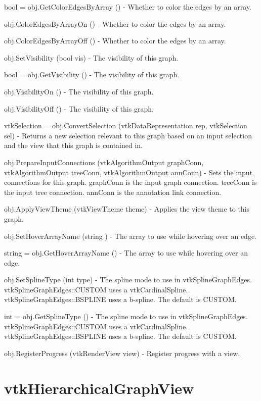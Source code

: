 \begin{DoxyItemize}
\item {\ttfamily bool = obj.\-Get\-Color\-Edges\-By\-Array ()} -\/ Whether to color the edges by an array.  
\item {\ttfamily obj.\-Color\-Edges\-By\-Array\-On ()} -\/ Whether to color the edges by an array.  
\item {\ttfamily obj.\-Color\-Edges\-By\-Array\-Off ()} -\/ Whether to color the edges by an array.  
\item {\ttfamily obj.\-Set\-Visibility (bool vis)} -\/ The visibility of this graph.  
\item {\ttfamily bool = obj.\-Get\-Visibility ()} -\/ The visibility of this graph.  
\item {\ttfamily obj.\-Visibility\-On ()} -\/ The visibility of this graph.  
\item {\ttfamily obj.\-Visibility\-Off ()} -\/ The visibility of this graph.  
\item {\ttfamily vtk\-Selection = obj.\-Convert\-Selection (vtk\-Data\-Representation rep, vtk\-Selection sel)} -\/ Returns a new selection relevant to this graph based on an input selection and the view that this graph is contained in.  
\item {\ttfamily obj.\-Prepare\-Input\-Connections (vtk\-Algorithm\-Output graph\-Conn, vtk\-Algorithm\-Output tree\-Conn, vtk\-Algorithm\-Output ann\-Conn)} -\/ Sets the input connections for this graph. graph\-Conn is the input graph connection. tree\-Conn is the input tree connection. ann\-Conn is the annotation link connection.  
\item {\ttfamily obj.\-Apply\-View\-Theme (vtk\-View\-Theme theme)} -\/ Applies the view theme to this graph.  
\item {\ttfamily obj.\-Set\-Hover\-Array\-Name (string )} -\/ The array to use while hovering over an edge.  
\item {\ttfamily string = obj.\-Get\-Hover\-Array\-Name ()} -\/ The array to use while hovering over an edge.  
\item {\ttfamily obj.\-Set\-Spline\-Type (int type)} -\/ The spline mode to use in vtk\-Spline\-Graph\-Edges. vtk\-Spline\-Graph\-Edges\-::\-C\-U\-S\-T\-O\-M uses a vtk\-Cardinal\-Spline. vtk\-Spline\-Graph\-Edges\-::\-B\-S\-P\-L\-I\-N\-E uses a b-\/spline. The default is C\-U\-S\-T\-O\-M.  
\item {\ttfamily int = obj.\-Get\-Spline\-Type ()} -\/ The spline mode to use in vtk\-Spline\-Graph\-Edges. vtk\-Spline\-Graph\-Edges\-::\-C\-U\-S\-T\-O\-M uses a vtk\-Cardinal\-Spline. vtk\-Spline\-Graph\-Edges\-::\-B\-S\-P\-L\-I\-N\-E uses a b-\/spline. The default is C\-U\-S\-T\-O\-M.  
\item {\ttfamily obj.\-Register\-Progress (vtk\-Render\-View view)} -\/ Register progress with a view.  
\end{DoxyItemize}\hypertarget{vtkviews_vtkhierarchicalgraphview}{}\section{vtk\-Hierarchical\-Graph\-View}\label{vtkviews_vtkhierarchicalgraphview}
